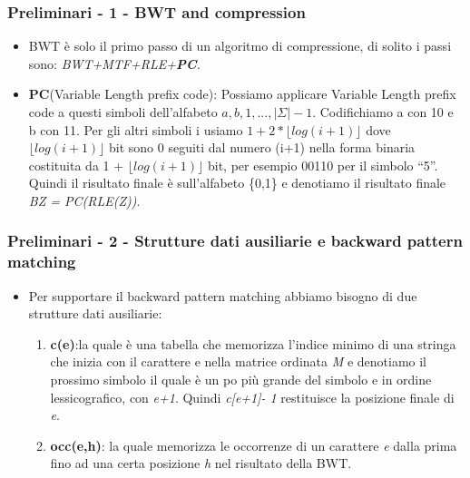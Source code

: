 \documentclass{beamer}
\begin{document}
\begin{frame}
\frametitle{Preliminari - 1 - BWT and compression}
\begin{itemize}
	\item BWT è solo il primo passo di un algoritmo di compressione, di solito i passi sono: \textit{BWT+MTF+RLE+\textbf{PC}.}
	\item \textbf{PC}(Variable Length prefix code): Possiamo applicare Variable Length prefix code a questi simboli dell'alfabeto $ {a,b,1,...,|\Sigma| -1} $. Codifichiamo a  con 10 e b  con 11. Per gli altri simboli i usiamo $ 1+2* \lfloor log(i+1) \rfloor $  dove  $\lfloor log(i+1) \rfloor$   bit  sono 0 seguiti dal numero (i+1)  nella forma binaria costituita da 1 +  $\lfloor log(i+1) \rfloor$   bit, per esempio 00110 per il simbolo ``5''. Quindi il risultato finale è sull’alfabeto \{0,1\} e denotiamo il risultato finale \textit{BZ = PC(RLE(Z))}.
	
\end{itemize}
\end{frame}

\begin{frame}
\frametitle{Preliminari - 2 - Strutture dati ausiliarie e backward pattern matching}
\begin{itemize}
	\item Per supportare il backward pattern matching abbiamo bisogno di due strutture dati ausiliarie:
	\begin{enumerate}
		\item \textbf{c(e)}:la quale è una tabella che memorizza l'indice minimo di una stringa che inizia con il carattere e nella matrice ordinata \textit{M} e denotiamo il prossimo simbolo il quale è un po più grande del simbolo e  in ordine lessicografico, con \textit{e+1}. Quindi \textit{c[e+1]- 1} restituisce la posizione finale di \textit{e}.
		\item \textbf{occ(e,h)}: la quale memorizza le occorrenze di un carattere \textit{e} dalla prima fino ad una certa posizione \textit{h} nel risultato della BWT. 
	\end{enumerate}
\end{itemize}
\end{frame}
\end{document}

